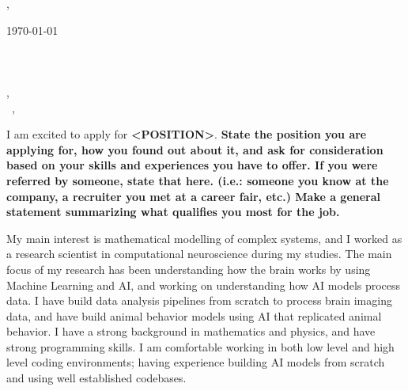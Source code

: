 \documentclass[12pt]{letter}
\begin{document}
\AddToShipoutPictureBG{%
  \color{gr}
  \AtPageUpperLeft{\rule[-1.3in]{\paperwidth}{1.3in}}
}

\begin{center}
  {\fontsize{28}{0}\selectfont\scshape \myname, \mytitle} \\
  \vspace{0.1in}
  \href{mailto:\myemail}{\faEnvelope\enspace \myemail}\hfill
  \href{https://linkedin.com/in/\mylinkedin}{\faLinkedinIn\enspace\mylinkedin}\hfill
  \href{tel:\myphone}{\faPhone\enspace \myphone}\hfill
  \faMapMarker\enspace \mylocation
\end{center}

\vspace{0.2in}

\today\vspace{0.1in}\\
\recipient\\
\company\\
\street\\
\city, \state\ \zip\\

\vspace{-0.1in}\greeting\ \recipient,\\

\vspace{-0.1in}\setlength\parindent{24pt}
\noindent

I am excited to apply for \textbf{<POSITION>}.
\textbf{
  State the position you are applying for, how you found out about it,
  and ask for consideration based on your skills and experiences you
  have to offer.
  If you were referred by someone, state that here.
  (i.e.: someone you know at the company, a recruiter you met at a
  career fair, etc.)
  Make a general statement summarizing what qualifies you most for the job.
}

My main interest is mathematical modelling of complex systems,
and I worked as a research scientist in computational neuroscience
during my studies.
The main focus of my research has been understanding how the brain
works by using Machine Learning and AI,
and working on understanding how AI models process data.
I have build data analysis pipelines from scratch to process brain imaging data,
and have build animal behavior models using AI that replicated animal behavior.
I have a strong background in mathematics and physics, and have
strong programming skills.
I am comfortable working in both low level and high level coding environments;
having experience building AI models from scratch and using well
established codebases.
\end{document}
